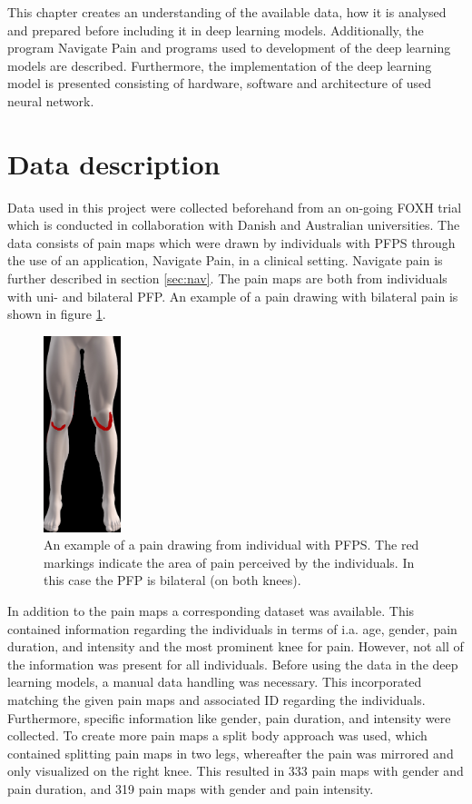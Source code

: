 This chapter creates an understanding of the available data, how it is analysed and prepared before including it in deep learning models. Additionally, the program Navigate Pain and programs used to development of the deep learning models are described. Furthermore, the implementation of the deep learning model is presented consisting of hardware, software and architecture of used neural network.

\section{Data description}
Data used in this project were collected beforehand from an on-going FOXH trial which is conducted in collaboration with Danish and Australian universities. The data consists of pain maps which were drawn by individuals with PFPS through the use of an application, Navigate Pain, in a clinical setting. Navigate pain is further described in section \ref{sec:nav}. The pain maps are both from individuals with uni- and bilateral PFP. An example of a pain drawing with bilateral pain is shown in figure \ref{fig:kneepainmap}.

\begin{figure} [H]
\centering
\includegraphics[width=0.2\textwidth]{figures/kneepainmap}
\caption{An example of a pain drawing from individual with PFPS. The red markings indicate the area of pain perceived by the individuals. In this case the PFP is bilateral (on both knees).}
\label{fig:kneepainmap}
\end{figure}

\noindent
In addition to the pain maps a corresponding dataset was available. This contained information regarding the individuals in terms of i.a. age, gender, pain duration, and intensity and the most prominent knee for pain. However, not all of the information was present for all individuals.
Before using the data in the deep learning models, a manual data handling was necessary. This incorporated matching the given pain maps and associated ID regarding the individuals. Furthermore, specific information like gender, pain duration, and intensity were collected.\newline
\noindent
To create more pain maps a split body approach was used, which contained splitting pain maps in two legs, whereafter the pain was mirrored and only visualized on the right knee. This resulted in 333 pain maps with gender and pain duration, and 319 pain maps with gender and pain intensity. 




